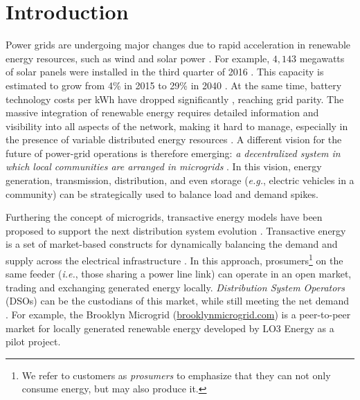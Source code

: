 \section{Introduction}


Power grids are undergoing major changes due to rapid acceleration in
renewable energy resources, such as wind and solar power
\cite{5430489}.
For example, $4,\!143$ megawatts of solar panels were installed in the
third quarter of 2016 \cite{seia}. This capacity is estimated to grow
from 4\% in 2015 to 29\% in 2040 \cite{Randal}. At the same time,
battery technology costs per kWh have dropped significantly
\cite{stock2015powerful}, reaching grid parity.
The massive integration of renewable energy requires detailed
information and visibility into all aspects of the network, making it
hard to manage, especially in the presence of variable distributed
energy resources \cite{7452738}. A different vision for the future of
power-grid operations is therefore emerging: {\em a decentralized
  system in which local communities are arranged in microgrids}
\cite{rahimi2012transactive}. In this vision, energy generation,
transmission, distribution, and even storage (\emph{e.g.}, electric
vehicles in a community) can be strategically used to balance load and
demand spikes.

Furthering the concept of microgrids, transactive energy models have
been proposed to support the next distribution system evolution
\cite{kok2016society,cox2013structured,melton2013gridwise}. Transactive
energy is a set of market-based constructs for dynamically balancing
the demand and supply across the electrical infrastructure
\cite{melton2013gridwise}. In this approach, prosumers\footnote{We
  refer to customers as \emph{prosumers} to emphasize that they can
  not only consume energy, but may also produce it.} on the same
feeder (\emph{i.e.}, those sharing a power line link) can operate in
an open market, trading and exchanging generated energy
locally. \emph{Distribution System Operators} (DSOs) can be the
custodians of this market, while still meeting the net demand
\cite{7462854}. For example, the Brooklyn Microgrid
(\url{brooklynmicrogrid.com}) is a peer-to-peer market for locally
generated renewable energy developed by LO3 Energy as a pilot project.

